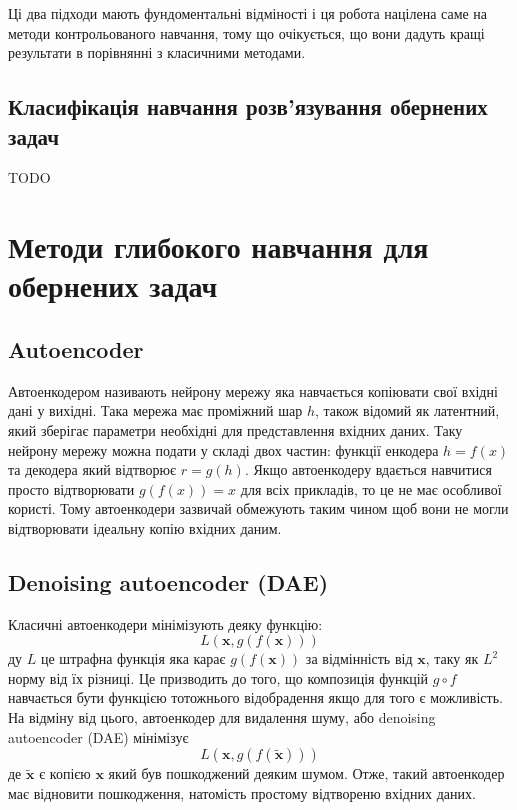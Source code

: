 \documentclass[14pt,a4paper]{extarticle}
\newcounter{e}
\numberwithin{equation}{section}
\numberwithin{figure}{section}
\begin{document}
	Ці два підходи мають фундоментальні відміності і ця робота націлена саме на методи контрольованого навчання, тому що очікується, що вони дадуть кращі результати в порівнянні з класичними методами. 
	
	\subsection{Класифікація навчання розв'язування обернених задач}
	
	TODO
	
	\newpage
	\thispagestyle{empty}
	\section{Методи глибокого навчання для обернених задач}
	
	\subsection{Autoencoder}		
	Автоенкодером називають нейрону мережу яка навчається копіювати свої вхідні дані у вихідні. Така мережа має проміжний шар $h$, також відомий як латентний, який зберігає параметри необхідні для представлення вхідних даних. Таку нейрону мережу можна подати у складі двох частин: функції енкодера $h = f(x)$ та декодера який відтворює $r = g(h)$. Якщо автоенкодеру вдається навчитися просто відтворювати $g(f(x)) = x$ для всіх прикладів, то це не має особливої користі. Тому автоенкодери зазвичай обмежують таким чином щоб вони не могли відтворювати ідеальну копію вхідних даним.
	
	\begin{comment}
	Usually they arerestricted in ways that allow them to copy only approximately, and to copy onlyinput that resembles the training data. Because the model is forced to prioritizewhich aspects of the input should be copied, it often learns useful properties of thedata
		
	Rather than adding a penalty $\Omega$ to the cost function, we can obtain an autoencoder that learns something useful by changing the reconstruction error term of the cost function.
	\end{comment}
	
	\subsection{Denoising autoencoder (DAE)}
	Класичні автоенкодери мінімізують деяку функцію:
	$$
	L(\boldsymbol{x}, g(f(\boldsymbol{x})))
	$$
	ду $L$ це штрафна функція яка карає $g(f(\boldsymbol{x}))$ за відмінність від $\boldsymbol{x}$, таку як $L^{2}$ норму від їх різниці. Це призводить до того, що композиція функцій $g \circ f$ навчається бути функцією тотожнього відобрадення якщо для того є можливість. На відміну від цього, автоенкодер для видалення шуму, або denoising autoencoder (DAE) мінімізує
	$$
	L(\boldsymbol{x}, g(f(\tilde{\boldsymbol{x}})))
	$$
	де $\tilde{\boldsymbol{x}}$ є копією $\boldsymbol{x}$ який був пошкоджений деяким шумом. Отже, такий автоенкодер має відновити пошкодження, натомість простому відтвореню вхідних даних.
\end{document}
